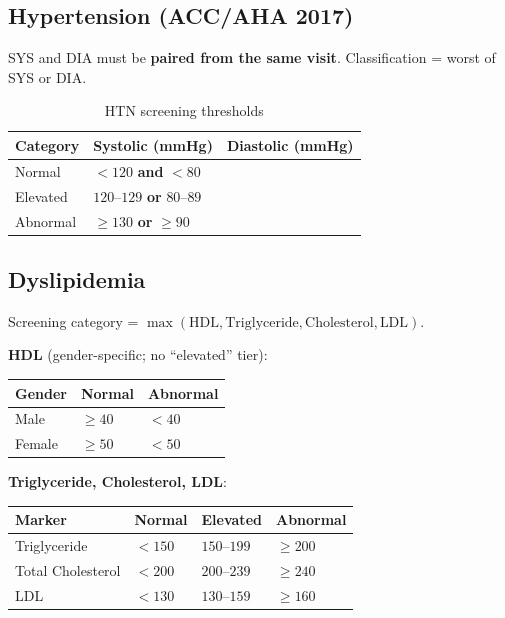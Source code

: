 \documentclass[11pt,a4paper]{article}
\begin{document}
\subsection{Hypertension (ACC/AHA 2017)}

SYS and DIA must be \textbf{paired from the same visit}. Classification = worst of SYS or DIA.

\begin{table}[ht]
\centering
\caption{HTN screening thresholds}
\begin{tabular}{@{}lll@{}}
\toprule
\textbf{Category} & \textbf{Systolic (mmHg)} & \textbf{Diastolic (mmHg)} \\
\midrule
Normal   & $< 120$ \textbf{and} $< 80$ \\
Elevated & $120$--$129$ \textbf{or} $80$--$89$ \\
Abnormal & $\geq 130$ \textbf{or} $\geq 90$ \\
\bottomrule
\end{tabular}
\end{table}

\subsection{Dyslipidemia}

Screening category = $\max(\text{HDL}, \text{Triglyceride}, \text{Cholesterol}, \text{LDL})$.

\textbf{HDL} (gender-specific; no ``elevated'' tier):

\begin{table}[ht]
\centering
\begin{tabular}{@{}lll@{}}
\toprule
\textbf{Gender} & \textbf{Normal} & \textbf{Abnormal} \\
\midrule
Male   & $\geq 40$ & $< 40$ \\
Female & $\geq 50$ & $< 50$ \\
\bottomrule
\end{tabular}
\end{table}

\textbf{Triglyceride, Cholesterol, LDL}:

\begin{table}[ht]
\centering
\begin{tabular}{@{}llll@{}}
\toprule
\textbf{Marker} & \textbf{Normal} & \textbf{Elevated} & \textbf{Abnormal} \\
\midrule
Triglyceride      & $< 150$ & $150$--$199$ & $\geq 200$ \\
Total Cholesterol & $< 200$ & $200$--$239$ & $\geq 240$ \\
LDL               & $< 130$ & $130$--$159$ & $\geq 160$ \\
\bottomrule
\end{tabular}
\end{table}
\end{document}
